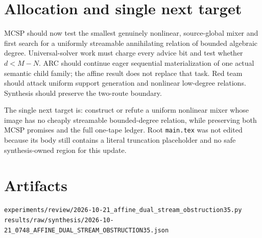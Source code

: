 \documentclass[11pt]{article}
\begin{document}
\section*{Allocation and single next target}
MCSP should now test the smallest genuinely nonlinear, source-global mixer and
first search for a uniformly streamable annihilating relation of bounded
algebraic degree.  Universal-solver work must charge every advice bit and test
whether $d<M-N$.  ARC should continue eager sequential materialization of one
actual semantic child family; the affine result does not replace that task.
Red team should attack uniform support generation and nonlinear low-degree
relations.  Synthesis should preserve the two-route boundary.

The single next target is: construct or refute a uniform nonlinear mixer whose
image has no cheaply streamable bounded-degree relation, while preserving both
MCSP promises and the full one-tape ledger.  Root \texttt{main.tex} was not
edited because its body still contains a literal truncation placeholder and no
safe synthesis-owned region for this update.

\section*{Artifacts}
\nolinkurl{experiments/review/2026-10-21_affine_dual_stream_obstruction35.py}\newline
\nolinkurl{results/raw/synthesis/2026-10-21_0748_AFFINE_DUAL_STREAM_OBSTRUCTION35.json}

\end{document}
